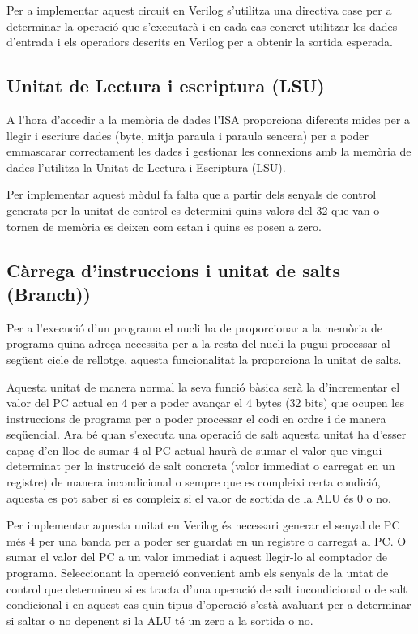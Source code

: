 \documentclass[10pt,a4paper,twocolumn,twoside]{article}
\begin{document}
    Per a implementar aquest circuit en Verilog s'utilitza una directiva case per a determinar la operació que s'executarà i en cada cas concret utilitzar les dades d'entrada i els operadors descrits en Verilog per a obtenir la sortida esperada.
    
    \subsection{Unitat de Lectura i escriptura (LSU)}
    A l'hora d'accedir a la memòria de dades l'ISA proporciona diferents mides per a llegir i escriure dades (byte, mitja paraula i paraula sencera) per a poder emmascarar correctament les dades i  gestionar les connexions amb la memòria de dades l'utilitza la Unitat de Lectura i Escriptura (LSU). 
    
    Per implementar aquest mòdul fa falta que a partir dels senyals de control generats per la unitat de control es determini quins valors del 32 que van o tornen de memòria es deixen com estan i quins es posen a zero.
    
    \subsection{ Càrrega d'instruccions i unitat de salts (Branch))}%
    Per a l'execució d'un programa el nucli ha de proporcionar a la memòria de programa quina adreça necessita per a la resta del nucli la pugui processar al següent cicle de rellotge, aquesta funcionalitat la proporciona la unitat de salts. 
    
    Aquesta unitat de manera normal la seva funció bàsica serà la d'incrementar el valor del PC actual en 4 per a poder avançar el 4 bytes (32 bits) que ocupen les instruccions de programa per a poder processar el codi en ordre i de manera seqüencial. Ara bé quan s'executa una operació de salt aquesta unitat ha d'esser capaç d'en lloc de sumar 4 al PC actual haurà de sumar el valor que vingui determinat per la instrucció de salt concreta (valor immediat o carregat en un registre) de manera incondicional o sempre que es compleixi certa condició, aquesta es pot saber si es compleix si el valor de sortida de la ALU és 0 o no.
    
    Per implementar aquesta unitat en Verilog és necessari generar el senyal de PC més 4 per una banda per a poder ser guardat en un registre o carregat al PC. O sumar el valor del PC a un valor immediat i aquest llegir-lo al comptador de programa. Seleccionant la operació convenient amb els senyals de la untat de control que determinen si es tracta d'una operació de salt incondicional o de salt condicional i en aquest cas quin  tipus d'operació s'està avaluant per a determinar si saltar o no depenent si la ALU té un zero a la sortida o no.
    
\end{document}
